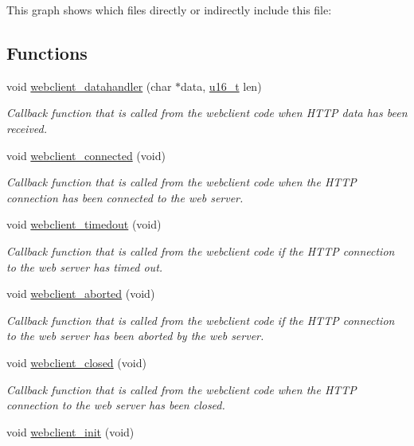 This graph shows which files directly or indirectly include this file:\subsection*{Functions}
\begin{CompactItemize}
\item 
void \hyperlink{a00079_gc4b119801e50cc1824498a1cdf9adc37}{webclient\_\-datahandler} (char $\ast$data, \hyperlink{a00070_gfc6499c1f28697aa3bfc2804d496fd11}{u16\_\-t} len)
\begin{CompactList}\small\item\em Callback function that is called from the webclient code when HTTP data has been received. \item\end{CompactList}\item 
void \hyperlink{a00079_g6b942c1ef22f8cd1a726ef3364c9fbea}{webclient\_\-connected} (void)
\begin{CompactList}\small\item\em Callback function that is called from the webclient code when the HTTP connection has been connected to the web server. \item\end{CompactList}\item 
void \hyperlink{a00079_g23705efb9077187881f094fc9be13bde}{webclient\_\-timedout} (void)
\begin{CompactList}\small\item\em Callback function that is called from the webclient code if the HTTP connection to the web server has timed out. \item\end{CompactList}\item 
void \hyperlink{a00079_gf11d9915ec12a8cdd9fdcbb5e8fcd5c7}{webclient\_\-aborted} (void)
\begin{CompactList}\small\item\em Callback function that is called from the webclient code if the HTTP connection to the web server has been aborted by the web server. \item\end{CompactList}\item 
void \hyperlink{a00079_gf8f12c820cc08da32aa62898bfc02db3}{webclient\_\-closed} (void)
\begin{CompactList}\small\item\em Callback function that is called from the webclient code when the HTTP connection to the web server has been closed. \item\end{CompactList}\item 
\hypertarget{a00079_g3caacabb2fe1c71921e1a471719ccbd2}{
void \hyperlink{a00079_g3caacabb2fe1c71921e1a471719ccbd2}{webclient\_\-init} (void)}
\label{a00079_g3caacabb2fe1c71921e1a471719ccbd2}


\end{CompactItemize}
